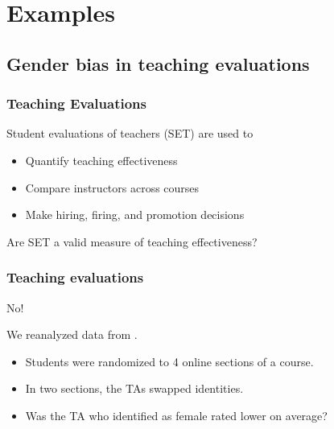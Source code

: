 \documentclass{beamer}
\begin{document}

\section[Examples]{Examples}
\subsection[Teaching evaluations]{Gender bias in teaching evaluations}


\frame
{
  \frametitle{Teaching Evaluations}
 \begin{center}
 \Large{ Student evaluations of teachers (SET) are used to} \\
  \begin{itemize}
  \item Quantify teaching effectiveness
  \item Compare instructors across courses
  \item Make hiring, firing, and promotion decisions  
  \end{itemize}
  \vfill
Are SET a valid measure of teaching effectiveness?
\end{center}
}


\frame
{
  \frametitle{Teaching evaluations}
  \begin{center}
  \Huge{No!}
  \end{center}
\Large

We reanalyzed data from \cite{macnell2014whats}.
\begin{center}
\begin{itemize}
\itemsep 15pt
\item Students were randomized to 4 online sections of a course.
\item In two sections, the TAs swapped identities.
\item Was the TA who identified as female rated lower on average?
\end{itemize}
\end{center}
}
\end{document}
